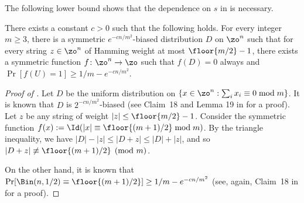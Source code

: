 The following lower bound shows that the dependence on $s$ in  is necessary.

\begin{claim} \label{claim:shifted-sym-bias-lb}
  There exists a constant $c > 0$ such that the following holds.
  For every integer $m \ge 3$, there is a symmetric $e^{-cn/m^2}$-biased distribution $D$ on $\zo^n$ such that for every string $z \in \zo^n$ of Hamming weight at most $\floor{m/2}-1$, there exists a symmetric function $f\colon \zo^n \to \zo$ such that $f(D)=0$ always and $\Pr[f(U) = 1] \ge 1/m - e^{-cn/m^2}$.
\end{claim}


\begin{proof}[Proof of ]
  Let $D$ be the uniform distribution on $\{ x \in \zo^n: \sum_i x_i \equiv 0 \bmod m\}$.
  It is known that $D$ is $2^{-cn/m^2}$-biased (see Claim~18 and Lemma 19 in \cite{BIJLSV21} for a proof). Let $z$ be any string of weight $|z| \le \floor{m/2}-1$.
  Consider the symmetric function $f(x) := \Id(|x| \equiv \floor{(m+1)/2} \bmod m)$.
  By the triangle inequality, we have $|D|-|z| \le |D+z| \le |D|+|z|$, and so $|D+z| \not\equiv \floor{(m+1)/2} \pmod m$.

  On the other hand, it is known that $\Pr[\Bin(n,1/2) \equiv \floor{(m+1)/2}] \ge 1/m - e^{-cn/m^2}$ (see, again, Claim~18 in \cite{BIJLSV21} for a proof).
\end{proof}

